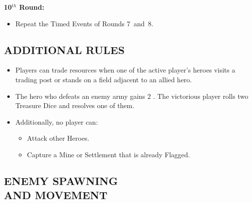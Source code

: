 \begin{multicols}{2}
\textbf{10$^{th}$ Round:}
\begin{itemize}
  \item Repeat the Timed Events of Rounds \mbox{7 and 8.}
\end{itemize}
\vspace{-0.5em}

\subsection*{\MakeUppercase{Additional Rules}}

\begin{itemize}
  \item Players can trade resources when one of the active player's heroes visits a trading post or stands on a field adjacent to an allied hero.
  \item The hero who defeats an enemy army gains 2 .
    The victorious player rolls two Treasure Dice and resolves one of them.
  \item Additionally, no player can:
  \begin{itemize}
      \item Attack other Heroes.
      \item Capture a Mine or Settlement that is already Flagged.
  \end{itemize}
\end{itemize}

\subsection*{\MakeUppercase{Enemy Spawning\\and Movement}}


\end{multicols}
